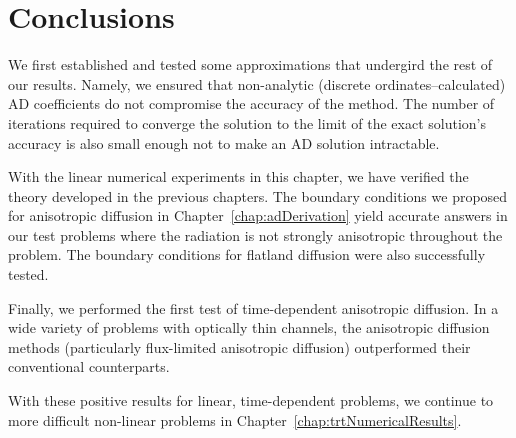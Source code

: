 \section{Conclusions}

We first established and tested some approximations that undergird the rest of
our results.  Namely, we ensured that non-analytic (discrete
ordinates--calculated) AD coefficients do not compromise the accuracy of the
method. The number of iterations required to converge the solution to the limit
of the exact solution's accuracy is also small enough not to make an AD
solution intractable.

With the linear numerical experiments in this chapter, we have verified the
theory developed in the previous chapters. The boundary conditions we proposed
for anisotropic diffusion in Chapter~\ref{chap:adDerivation} yield accurate
answers in our test problems where the radiation is not strongly anisotropic
throughout the problem. The boundary conditions for flatland diffusion were also
successfully tested.

Finally, we performed the first test of time-dependent anisotropic diffusion. In
a wide variety of problems with optically thin channels, the anisotropic
diffusion methods (particularly flux-limited anisotropic diffusion) outperformed
their conventional counterparts.

With these positive results for linear, time-dependent problems, we continue to
more difficult non-linear problems in Chapter~\ref{chap:trtNumericalResults}.

